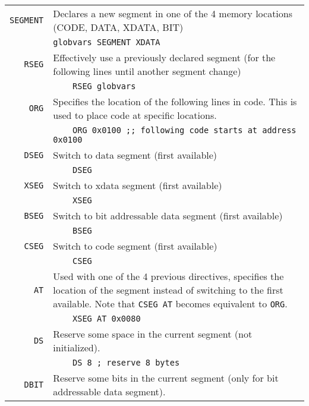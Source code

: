 \documentclass{article}
\begin{document}
\noindent
\begin{tabularx}{\textwidth}{rX}
  \texttt{SEGMENT}&Declares a new segment in one of the 4 memory
  locations (CODE, DATA, XDATA, BIT)\\
  &\texttt{globvars SEGMENT XDATA}\\
  \noalign{\smallskip}
  \hline
  \noalign{\smallskip}
  \texttt{RSEG}&Effectively use a previously declared segment (for the
  following lines until another segment change)\\
  &\texttt{\ \ \ \ RSEG globvars}\\
  \noalign{\smallskip}
  \hline
  \noalign{\smallskip}
  \texttt{ORG}&Specifies the location of the following lines in
  code. This is used to place code at specific locations.\\
  &\texttt{\ \ \ \ ORG 0x0100 ;; following code starts at address 0x0100}\\
  \noalign{\smallskip}
  \hline
  \noalign{\smallskip}
  \texttt{DSEG}&Switch to data segment (first available)\\
  &\texttt{\ \ \ \ DSEG}\\
  \noalign{\smallskip}
  \hline
  \noalign{\smallskip}
  \texttt{XSEG}&Switch to xdata segment (first available)\\
  &\texttt{\ \ \ \ XSEG}\\
  \noalign{\smallskip}
  \hline
  \noalign{\smallskip}
  \texttt{BSEG}&Switch to bit addressable data segment (first available)\\
  &\texttt{\ \ \ \ BSEG}\\
  \noalign{\smallskip}
  \hline
  \noalign{\smallskip}
  \texttt{CSEG}&Switch to code segment (first available)\\
  &\texttt{\ \ \ \ CSEG}\\
  \noalign{\smallskip}
  \hline
  \noalign{\smallskip}
  \texttt{AT}&Used with one of the 4 previous directives, specifies
  the location of the segment instead of switching to the first
  available. Note that \texttt{CSEG AT} becomes equivalent to \texttt{ORG}.\\
  &\texttt{\ \ \ \ XSEG AT 0x0080}\\
  \noalign{\smallskip}
  \hline
  \noalign{\smallskip}
  \texttt{DS}&Reserve some space in the current segment (not initialized).\\
  &\texttt{\ \ \ \ DS 8 ; reserve 8 bytes}\\
  \noalign{\smallskip}
  \hline
  \noalign{\smallskip}
  \texttt{DBIT}&Reserve some bits in the current segment (only for bit
  addressable data segment).\\

\end{tabularx}
\end{document}
